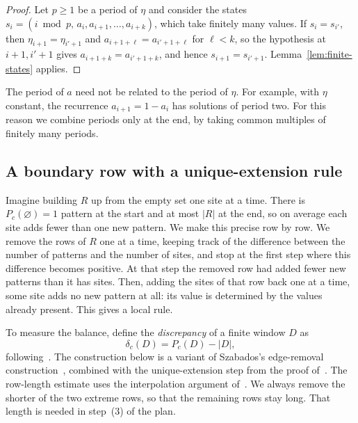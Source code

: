 \documentclass[11pt,a4paper,reqno]{amsart}
\theoremstyle{definition}
\theoremstyle{remark}
\numberwithin{equation}{section}
\begin{document}
\begin{proof}
Let $p\ge1$ be a period of $\eta$ and consider the states $s_i=(i\bmod p,\,a_i,a_{i+1},\ldots,a_{i+k})$, which take finitely many values. If $s_i=s_{i'}$, then $\eta_{i+1}=\eta_{i'+1}$ and $a_{i+1+\ell}=a_{i'+1+\ell}$ for $\ell<k$, so the hypothesis at $i+1,i'+1$ gives $a_{i+1+k}=a_{i'+1+k}$, and hence $s_{i+1}=s_{i'+1}$. Lemma~\ref{lem:finite-states} applies.
\end{proof}

The period of $a$ need not be related to the period of $\eta$. For example, with $\eta$ constant, the recurrence $a_{i+1}=1-a_i$ has solutions of period two. For this reason we combine periods only at the end, by taking common multiples of finitely many periods.

\subsection{A boundary row with a unique-extension rule}\label{ssec:window}
Imagine building $R$ up from the empty set one site at a time. There is $P_c(\varnothing)=1$ pattern at the start and at most $|R|$ at the end, so on average each site adds fewer than one new pattern. We make this precise row by row. We remove the rows of $R$ one at a time, keeping track of the difference between the number of patterns and the number of sites, and stop at the first step where this difference becomes positive. At that step the removed row had added fewer new patterns than it has sites. Then, adding the sites of that row back one at a time, some site adds no new pattern at all: its value is determined by the values already present. This gives a local rule.

To measure the balance, define the \emph{discrepancy} of a finite window $D$ as
\[
 \delta_c(D)=P_c(D)-|D|,
\]
following~\cite[Section~2.2]{CK}. The construction below is a variant of Szabados's edge-removal construction~\cite[Lemma~2]{Sz}, combined with the unique-extension step from the proof of~\cite[Lemma~4]{Sz}. The row-length estimate uses the interpolation argument of~\cite[Lemma~2.11]{CK}. We always remove the shorter of the two extreme rows, so that the remaining rows stay long. That length is needed in step~(3) of the plan.
\end{document}
